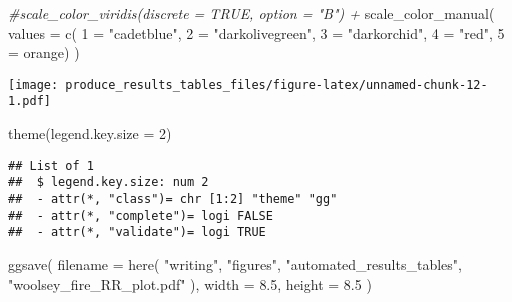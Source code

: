\documentclass[
]{article}
\newenvironment{Shaded}{\begin{snugshade}}{\end{snugshade}}
\newcommand{\AttributeTok}[1]{\textcolor[rgb]{0.77,0.63,0.00}{#1}}
\newcommand{\CommentTok}[1]{\textcolor[rgb]{0.56,0.35,0.01}{\textit{#1}}}
\newcommand{\DecValTok}[1]{\textcolor[rgb]{0.00,0.00,0.81}{#1}}
\newcommand{\FloatTok}[1]{\textcolor[rgb]{0.00,0.00,0.81}{#1}}
\newcommand{\FunctionTok}[1]{\textcolor[rgb]{0.00,0.00,0.00}{#1}}
\newcommand{\NormalTok}[1]{#1}
\newcommand{\OtherTok}[1]{\textcolor[rgb]{0.56,0.35,0.01}{#1}}
\newcommand{\StringTok}[1]{\textcolor[rgb]{0.31,0.60,0.02}{#1}}
\begin{document}
\begin{Shaded}
\begin{Highlighting}[]
  \CommentTok{\#scale\_color\_viridis(discrete = TRUE, option = "B") +}
  \FunctionTok{scale\_color\_manual}\NormalTok{(}
    \AttributeTok{values =} \FunctionTok{c}\NormalTok{(}
     \StringTok{\textasciigrave{}}\AttributeTok{1}\StringTok{\textasciigrave{}} \OtherTok{=} \StringTok{"cadetblue"}\NormalTok{,}
                                \StringTok{\textasciigrave{}}\AttributeTok{2}\StringTok{\textasciigrave{}} \OtherTok{=} \StringTok{"darkolivegreen"}\NormalTok{,}
                                \StringTok{\textasciigrave{}}\AttributeTok{3}\StringTok{\textasciigrave{}} \OtherTok{=} \StringTok{"darkorchid"}\NormalTok{,}
                                \StringTok{\textasciigrave{}}\AttributeTok{4}\StringTok{\textasciigrave{}} \OtherTok{=} \StringTok{"red"}\NormalTok{,}
                                \StringTok{\textasciigrave{}}\AttributeTok{5}\StringTok{\textasciigrave{}} \OtherTok{=} \StringTok{\textquotesingle{}orange\textquotesingle{}}\NormalTok{)}
\NormalTok{  ) }
\end{Highlighting}
\end{Shaded}

\texttt{[image: produce\_results\_tables\_files/figure-latex/unnamed-chunk-12-1.pdf]}

\begin{Shaded}
\begin{Highlighting}[]
\FunctionTok{theme}\NormalTok{(}\AttributeTok{legend.key.size =} \DecValTok{2}\NormalTok{)}
\end{Highlighting}
\end{Shaded}

\begin{verbatim}
## List of 1
##  $ legend.key.size: num 2
##  - attr(*, "class")= chr [1:2] "theme" "gg"
##  - attr(*, "complete")= logi FALSE
##  - attr(*, "validate")= logi TRUE
\end{verbatim}

\begin{Shaded}
\begin{Highlighting}[]
\FunctionTok{ggsave}\NormalTok{(}
  \AttributeTok{filename =} \FunctionTok{here}\NormalTok{(}
    \StringTok{"writing"}\NormalTok{,}
    \StringTok{"figures"}\NormalTok{,}
    \StringTok{"automated\_results\_tables"}\NormalTok{,}
    \StringTok{"woolsey\_fire\_RR\_plot.pdf"}
\NormalTok{  ),}
  \AttributeTok{width =} \FloatTok{8.5}\NormalTok{,}
  \AttributeTok{height =} \FloatTok{8.5}
\NormalTok{) }
\end{Highlighting}
\end{Shaded}
\end{document}
